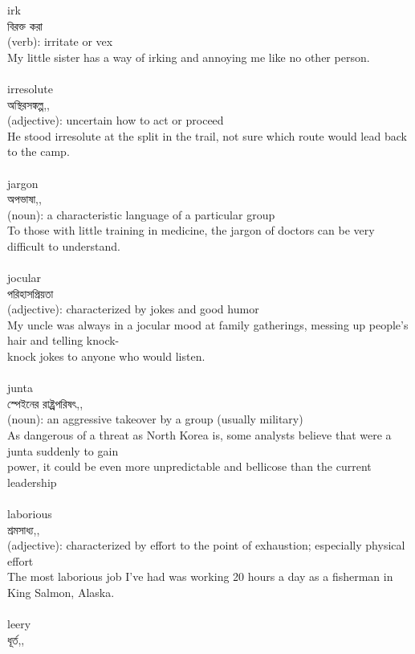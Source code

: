 \documentclass{article}
\begin{document}
{irk}\\
{বিরক্ত করা}\\
{(verb): irritate or vex\\My little sister has a way of irking and annoying me like no other person.\\}\\
{irresolute}\\
{অস্থিরসঙ্কল্প,,}\\
{(adjective): uncertain how to act or proceed\\He stood irresolute at the split in the trail, not sure which route would lead back to the camp.\\}\\
{jargon}\\
{অপভাষা,,}\\
{(noun): a characteristic language of a particular group\\To those with little training in medicine, the jargon of doctors can be very difficult to understand.\\}\\
{jocular}\\
{পরিহাসপ্রিয়তা}\\
{(adjective): characterized by jokes and good humor\\My uncle was always in a jocular mood at family gatherings, messing up people's hair and telling knock-\\knock jokes to anyone who would listen.\\}\\
{junta}\\
{স্পেইনের রাষ্ট্র্রপরিষৎ,,}\\
{(noun): an aggressive takeover by a group (usually military)\\As dangerous of a threat as North Korea is, some analysts believe that were a junta suddenly to gain\\power, it could be even more unpredictable and bellicose than the current leadership\\}\\
{laborious}\\
{শ্রমসাধ্য,,}\\
{(adjective): characterized by effort to the point of exhaustion; especially physical effort\\The most laborious job I've had was working 20 hours a day as a fisherman in King Salmon, Alaska.\\}\\
{leery}\\
{ধূর্ত,,}\\
\end{document}

